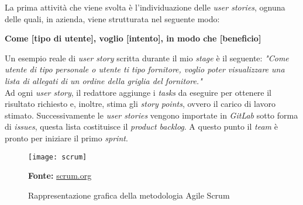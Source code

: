 La prima attività che viene svolta è l'individuazione delle \emph{user stories}, ognuna delle quali, in azienda, viene strutturata nel seguente modo:
\begin{center}
  \textbf{Come [tipo di utente], voglio [intento], in modo che [beneficio]}
\end{center}

Un esempio reale di \emph{user story} scritta durante il mio \emph{stage} è il seguente: 
\newline
\emph{"Come utente di tipo personale o utente ti tipo fornitore, voglio poter visualizzare una lista di allegati di un ordine della griglia del fornitore."} \\

Ad ogni \emph{user story}, il redattore aggiunge i \emph{tasks} da eseguire per ottenere il risultato richiesto e, inoltre, stima gli \emph{story points}, ovvero il carico di lavoro stimato.
Successivamente le \emph{user stories} vengono importate in \emph{GitLab} sotto forma di \emph{issues}, questa lista costituisce il \emph{product backlog}.
A questo punto il \emph{team} è pronto per iniziare il primo \emph{sprint}. \\

\begin{figure}[!ht]
  \begin{center}
    \texttt{[image: scrum]}
    \caption{Rappresentazione grafica della metodologia Agile Scrum}
    \textbf{Fonte:} \href{https://www.scrum.org}{scrum.org}
    \label{fig:scrum}
  \end{center}
\end{figure}

